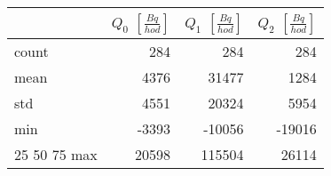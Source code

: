 \begin{tabular}{lrrr}
\toprule
{} &  $Q_0$ $\left[\si{\frac{Bq}{hod}}\right]$ &  $Q_1$ $\left[\si{\frac{Bq}{hod}}\right]$ &  $Q_2$ $\left[\si{\frac{Bq}{hod}}\right]$ \\
\midrule
count &                                       284 &                                       284 &                                       284 \\
mean  &                                      4376 &                                     31477 &                                      1284 \\
std   &                                      4551 &                                     20324 &                                      5954 \\
min   &                                     -3393 &                                    -10056 &                                    -19016 \\
25%
50%
75%
max   &                                     20598 &                                    115504 &                                     26114 \\
\bottomrule
\end{tabular}
